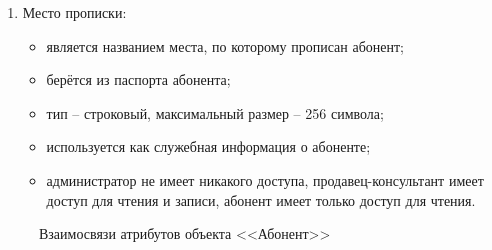 \begin{enumerate}
\begin{enumerate}
        \item Место прописки:
        \begin{itemize}
            \item является названием места, по которому прописан абонент;
            \item берётся из паспорта абонента;
            \item тип -- строковый, максимальный размер -- 256 символа;
            \item используется как служебная информация о абоненте;
            \item администратор не имеет никакого доступа, продавец-консультант имеет доступ для чтения и записи, абонент имеет только доступ для чтения.
        \end{itemize}
    \end{enumerate}
    \begin{figure}[H]
        \label{fig:subscriber-attributes}
        \caption{Взаимосвязи атрибутов объекта <<Абонент>>}
    \end{figure}
\end{enumerate}